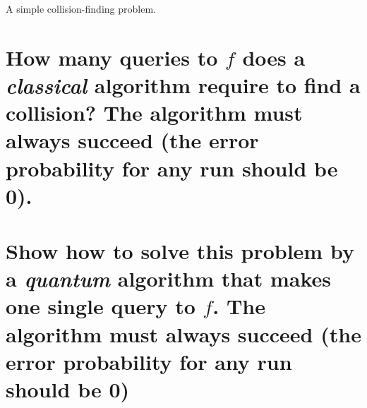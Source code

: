 \documentclass[boxes,pages]{homework}
\begin{document}
\begin{problem}
A simple collision-finding problem.
\begin{parts}
	\part{How many queries to $f$ does a \emph{classical} algorithm require to find a collision? The algorithm must always succeed (the error probability for any run should be 0).}\label{part:2a}
	\part{Show how to solve this problem by a \emph{quantum} algorithm that makes one single query to $f$. The algorithm must always succeed (the error probability for any run should be 0)}\label{part:2b}
\end{parts}
\end{problem}
\end{document}
